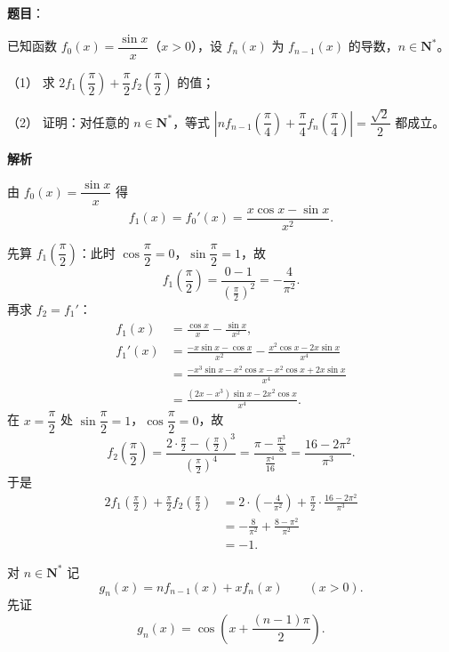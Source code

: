 \begin{answer}

\textbf{题目}：

已知函数 $f_0(x)=\dfrac{\sin x}{x}$（$x>0$），设 $f_n(x)$ 为 $f_{n-1}(x)$ 的导数，$n\in\mathbf N^*$。

（1） 求 $2f_1\left(\dfrac\pi2\right)+\dfrac\pi2f_2\left(\dfrac\pi2\right)$ 的值；

（2） 证明：对任意的 $n\in\mathbf N^*$，等式 $\left|nf_{n-1}\left(\dfrac\pi4\right)+\dfrac\pi4f_n\left(\dfrac\pi4\right)\right|=\dfrac{\sqrt2}{2}$ 都成立。

\textbf{解析}

由 $f_0(x)=\dfrac{\sin x}x$ 得
\nopagebreak[4]
\[f_1(x)=f_0'(x)=\frac{x\cos x-\sin x}{x^2}.\]


先算 $f_1\left(\dfrac\pi2\right)$：此时 $\cos\dfrac\pi2=0$，$\sin\dfrac\pi2=1$，故
\nopagebreak[4]
\[f_1\left(\frac\pi2\right)=\frac{0-1}{\left(\frac\pi2\right)^2}=-\frac4{\pi^2}.\]
再求 $f_2=f_1'$：
\nopagebreak[4]
\[\begin{aligned}
f_1(x)&=\frac{\cos x}{x}-\frac{\sin x}{x^2},\\
f_1'(x)&=\frac{-x\sin x-\cos x}{x^2}-\frac{x^2\cos x-2x\sin x}{x^4}\\
&=\frac{-x^3\sin x-x^2\cos x-x^2\cos x+2x\sin x}{x^4}\\
&=\frac{\left(2x-x^3\right)\sin x-2x^2\cos x}{x^4}.
\end{aligned}\]
在 $x=\dfrac\pi2$ 处 $\sin\dfrac\pi2=1$，$\cos\dfrac\pi2=0$，故
\nopagebreak[4]
\[f_2\left(\frac\pi2\right)=\frac{2\cdot\frac\pi2-\left(\frac\pi2\right)^3}{\left(\frac\pi2\right)^4}
=\frac{\pi-\frac{\pi^3}8}{\frac{\pi^4}{16}}=\frac{16-2\pi^2}{\pi^3}.\]
于是
\nopagebreak[4]
\[\begin{aligned}
2f_1\left(\frac\pi2\right)+\frac\pi2f_2\left(\frac\pi2\right)
&=2\cdot\left(-\frac4{\pi^2}\right)+\frac\pi2\cdot\frac{16-2\pi^2}{\pi^3}\\
&=-\frac8{\pi^2}+\frac{8-\pi^2}{\pi^2}\\
&=-1.
\end{aligned}\]


对 $n\in\mathbf N^*$ 记
\nopagebreak[4]
\[g_n(x)=nf_{n-1}(x)+xf_n(x)\qquad(x>0).\]
先证
\nopagebreak[4]
\[g_n(x)=\cos\left(x+\frac{(n-1)\pi}2\right).\]


\end{answer}
